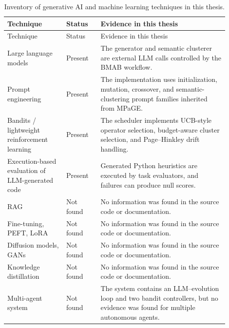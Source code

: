\begin{longtable}{
  >{\raggedright\arraybackslash}p{0.24\linewidth}
  >{\raggedright\arraybackslash}p{0.14\linewidth}
  >{\raggedright\arraybackslash}p{0.52\linewidth}
}
\caption{Inventory of generative AI and machine learning techniques in this thesis.}
\label{tab:technique-inventory}\\
\toprule
Technique & Status & Evidence in this thesis \\
\midrule
\endfirsthead
\toprule
Technique & Status & Evidence in this thesis \\
\midrule
\endhead
Large language models & Present & The generator and semantic clusterer are external LLM calls controlled by the BMAB workflow. \\
Prompt engineering & Present & The implementation uses initialization, mutation, crossover, and semantic-clustering prompt families inherited from MPaGE. \\
Bandits / lightweight reinforcement learning & Present & The scheduler implements UCB-style operator selection, budget-aware cluster selection, and Page--Hinkley drift handling. \\
Execution-based evaluation of LLM-generated code & Present & Generated Python heuristics are executed by task evaluators, and failures can produce null scores. \\
RAG & Not found & No information was found in the source code or documentation. \\
Fine-tuning, PEFT, LoRA & Not found & No information was found in the source code or documentation. \\
Diffusion models, GANs & Not found & No information was found in the source code or documentation. \\
Knowledge distillation & Not found & No information was found in the source code or documentation. \\
Multi-agent system & Not found & The system contains an LLM--evolution loop and two bandit controllers, but no evidence was found for multiple autonomous agents. \\
\bottomrule
\end{longtable}
